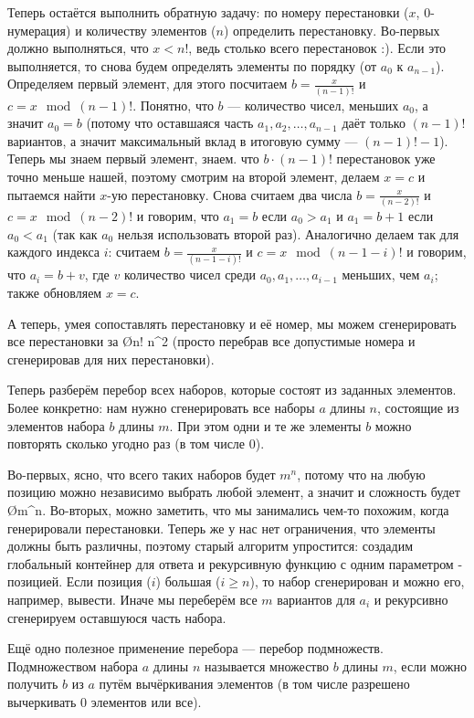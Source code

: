 Теперь остаётся выполнить обратную задачу: по номеру перестановки ($x$, 0-нумерация) и количеству элементов ($n$) определить перестановку. Во-первых должно выполняться, что $x < n!$, ведь столько всего перестановок :). Если это выполняется, то снова будем определять элементы по порядку (от $a_0$ к $a_{n - 1}$). Определяем первый элемент, для этого посчитаем $b = \frac{x}{(n - 1)!}$ и $c = x \mod (n - 1)!$. Понятно, что $b$ — количество чисел, меньших $a_0$, а значит $a_0 = b$ (потому что оставшаяся часть $a_1, a_2, \ldots, a_{n - 1}$ даёт только $(n - 1)!$ вариантов, а значит максимальный вклад в итоговую сумму —  $(n - 1)! - 1$). Теперь мы знаем первый элемент, знаем. что $b \cdot (n - 1)!$ перестановок уже точно меньше нашей, поэтому смотрим на второй элемент, делаем $x = c$ и пытаемся найти $x$-ую перестановку. Снова считаем два числа $b = \frac{x}{(n - 2)!}$ и $c = x \mod (n - 2)!$ и говорим, что $a_1 = b$ если $a_0 > a_1$ и $a_1 = b + 1$ если $a_0 < a_1$ (так как $a_0$ нельзя использовать второй раз). Аналогично делаем так для каждого индекса $i$: считаем $b = \frac{x}{(n - 1 - i)!}$ и $c = x \mod (n - 1 - i)!$ и говорим, что $a_i = b + v$, где $v$ количество чисел среди $a_0, a_1, \ldots, a_{i - 1}$ меньших, чем $a_i$; также обновляем $x = c$.

А теперь, умея сопоставлять перестановку и её номер, мы можем сгенерировать все перестановки за \O{n! \cdot n^2} (просто перебрав все допустимые номера и сгенерировав для них перестановки).


Теперь разберём перебор всех наборов, которые состоят из заданных элементов. Более конкретно: нам нужно сгенерировать все наборы $a$ длины $n$, состоящие из элементов набора $b$ длины $m$. При этом одни и те же элементы $b$ можно повторять сколько угодно раз (в том числе 0).

Во-первых, ясно, что всего таких наборов будет $m^n$, потому что на любую позицию можно независимо выбрать любой элемент, а значит и сложность будет \O{m^n}. Во-вторых, можно заметить, что мы занимались чем-то похожим, когда генерировали перестановки. Теперь же у нас нет ограничения, что элементы должны быть различны, поэтому старый алгоритм упростится: создадим глобальный контейнер для ответа и рекурсивную функцию с одним параметром - позицией. Если позиция ($i$) большая ($i \geq n$), то набор сгенерирован и можно его, например, вывести. Иначе мы переберём все $m$ вариантов для $a_i$ и рекурсивно сгенерируем оставшуюся часть набора.


Ещё одно полезное применение перебора — перебор подмножеств. Подмножеством набора $a$ длины $n$ называется множество $b$ длины $m$, если можно получить $b$ из $a$ путём вычёркивания элементов (в том числе разрешено вычеркивать 0 элементов или все).

